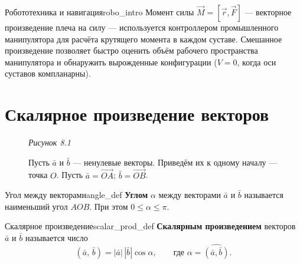 \documentclass[12pt,a4paper]{article}
\newcommand{\va}{\bar{a}}
\newcommand{\vb}{\bar{b}}
\begin{document}
\begin{remarkIT}{Робототехника и навигация}{robo_intro}
  Момент силы $\vec{M} = [\vec{r}, \vec{F}]$ — векторное произведение плеча
  на силу — используется контроллером промышленного манипулятора для расчёта
  крутящего момента в каждом суставе. Смешанное произведение позволяет
  быстро оценить объём рабочего пространства манипулятора и обнаружить
  вырожденные конфигурации ($V = 0$, когда оси суставов компланарны).
\end{remarkIT}

\section*{Скалярное произведение векторов}

\begin{figure}[ht]
  \centering
  \begin{minipage}{0.4\textwidth}
    \centering

    \smallskip
    \textit{Рисунок 8.1}
  \end{minipage}
  \hfill
  \begin{minipage}{0.5\textwidth}
    Пусть $\va$ и $\vb$ --- ненулевые векторы.
    Приведём их к одному началу ---
    точка $O$. Пусть $\va = \overrightarrow{OA}$; $\vb = \overrightarrow{OB}$.
  \end{minipage}
\end{figure}

\begin{definition}{Угол между векторами}{angle_def}
  \textbf{Углом} $\alpha$ между векторами $\va$ и $\vb$ называется наименьший
  угол $AOB$. При этом $0 \leq \alpha \leq \pi$.
\end{definition}

\begin{definition}{Скалярное произведение}{scalar_prod_def}
  \textbf{Скалярным произведением} векторов $\va$ и $\vb$ называется число
  \begin{equation}
    (\va,\,\vb) = |\va|\,|\vb|\cos\alpha, \qquad
    \text{где } \alpha = \widehat{(\va,\vb)}. \tag{8.1}
  \end{equation}
\end{definition}
\end{document}
